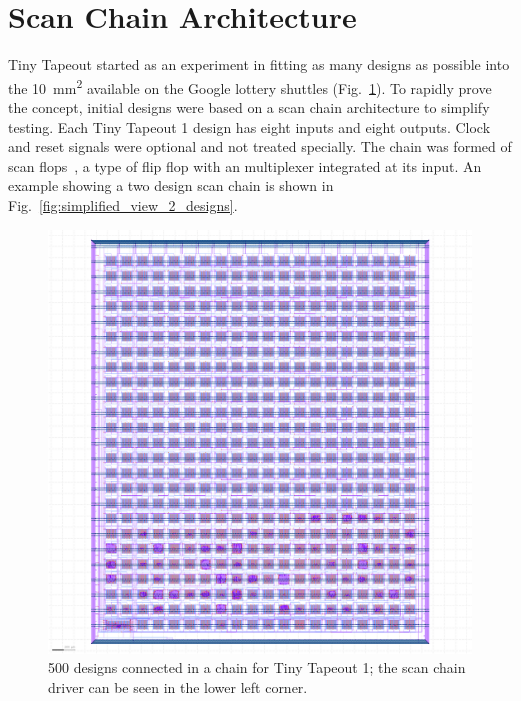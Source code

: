 \section{Scan Chain Architecture}
\label{sec:scanchain_arch}

Tiny Tapeout started as an experiment in fitting as many designs as possible into the \qty{10}{\milli\meter\squared} available on the Google lottery shuttles (Fig.~\ref{fig:500_designs_chain_TT01}).
To rapidly prove the concept, initial designs were based on a scan chain architecture to simplify testing.
Each Tiny Tapeout 1 design has eight inputs and eight outputs.
Clock and reset signals were optional and not treated specially. The chain was formed of scan flops~\cite{skywaterpdk}, a type of flip flop with an multiplexer integrated at its input. An example showing a two design scan chain is shown in Fig.~\ref{fig:simplified_view_2_designs}.

\begin{figure}[!t]
\centering
\includegraphics[width=1\columnwidth]{./Figs/tt01_whole_die.png}
\caption{500 designs connected in a chain for Tiny Tapeout 1; the scan chain driver can be seen in the lower left corner.}
\label{fig:500_designs_chain_TT01}
\end{figure}

